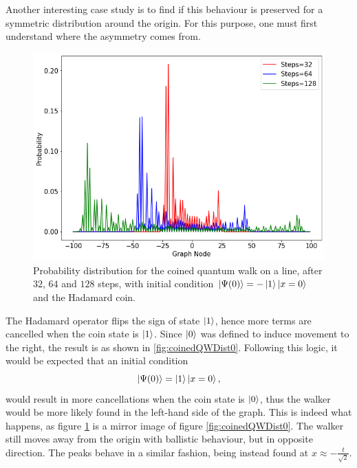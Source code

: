 \documentclass[../../dissertation.tex]{subfiles}
\begin{document}
Another interesting case study is to find if this behaviour is preserved for a
symmetric distribution around the origin. For this purpose, one must first
understand where the asymmetry comes from.
\begin{figure}[!h]
	\centering
	\includegraphics[scale=0.40]{img/CoinedQuantumWalk/CoinedMultiple_psi1_3264128.png}
	\caption{Probability distribution for the coined quantum walk on a line, after $32$, $64$ and $128$ steps, with initial condition $\ket{\Psi(0)}=-\ket{1}\ket{x=0}$ and the Hadamard coin.} 
	\label{fig:coinedQWDist1}
\end{figure}
The Hadamard operator flips the sign of state $\ket{1}$, hence more terms are
cancelled when the coin state is $\ket{1}$. Since $\ket{0}$ was defined to
induce movement to the right, the result is as shown in
\ref{fig:coinedQWDist0}. Following this logic, it would be expected that an
initial condition 
\begin{equation}
	\ket{\Psi(0)} = \ket{1}\ket{x=0},
	\label{eq:coinedQWInitCond1}
\end{equation}
would result in more cancellations when the coin state is $\ket{0}$, thus the
walker would be more likely found in the left-hand side of the graph. This is
indeed what happens, as figure \ref{fig:coinedQWDist1} is a mirror image of
figure \ref{fig:coinedQWDist0}. The walker still moves away from the origin
with ballistic behaviour, but in opposite direction. The peaks behave in a
similar fashion, being instead found at $x \approx -\frac{t}{\sqrt{2}}$.\par
\end{document}

